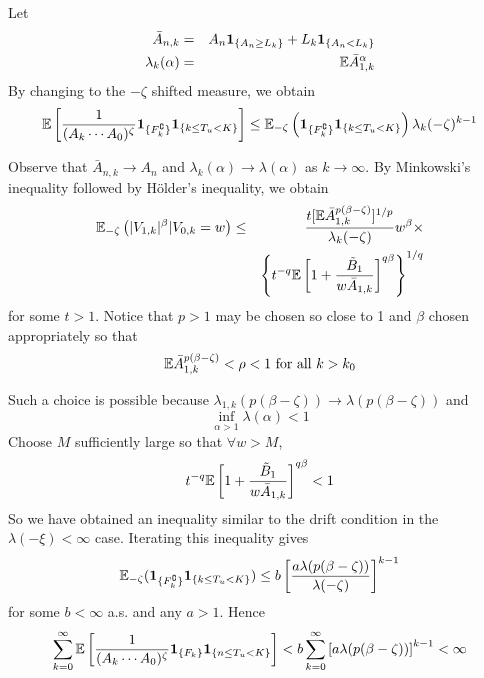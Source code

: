 \documentclass{beamer}
\begin{document}
\begin{frame}
  Let
  \begin{eqnarray*}
    \bar A_{n,k} &=& A_{n} \mathbf{1}_{\{A_n \geq L_k\}} + L_k \mathbf{1}_{\{A_n < L_k\}} \\
    \lambda_k(\alpha) &=& \mathbb{E} \bar A_{1,k}^\alpha
  \end{eqnarray*}
  By changing to the $-\zeta$ shifted measure, we obtain
  \[
  \mathbb{E} \left[
  {
    1\over
    (A_k \cdots A_0)^\zeta
  } \mathbf{1}_{\{F_k^\complement\}} \mathbf{1}_{\{k \leq T_u < K\}} \right]
  \leq \mathbb{E}_{-\zeta}\left(\mathbf{1}_{\{F_k^\complement\}} \mathbf{1}_{\{k \leq T_u < K\}}\right)
  \lambda_k(-\zeta)^{k-1} 
  \]
\end{frame}

\begin{frame}
  Observe that $\bar A_{n,k} \to A_n$ and $\lambda_k(\alpha) \to
  \lambda(\alpha)$ as $k \to \infty$. By Minkowski's inequality
  followed by H\"older's inequality, we obtain
  \begin{eqnarray*}
    \mathbb{E}_{-\zeta} \left( |V_{1,k}|^\beta | V_{0,k} = w\right) &\leq& {
    t [\mathbb{E} \bar A_{1,k}^{p(\beta - \zeta)}]^{1/p}
    \over
    \lambda_k(-\zeta)
  } w^\beta \times \\
  && \left\{
    t^{-q} \mathbb{E} \left[
      1 + {
        \tilde B_1
        \over
        w \bar A_{1,k}
      }
    \right]^{q\beta}
  \right\}^{1/q}
  \end{eqnarray*}
  for some $t > 1$. Notice that $p > 1$ may be chosen so close to 1
  and $\beta$ chosen appropriately so that
  \[
  \mathbb{E} \bar A_{1,k}^{p(\beta - \zeta)} < \rho < 1 \text{ for all } k > k_0
  \]
\end{frame}

\begin{frame}
  Such a choice is possible because $\lambda_{1,k}(p(\beta - \zeta))
  \to \lambda(p(\beta - \zeta))$ and
  \[
  \inf_{\alpha > 1} \lambda(\alpha) < 1
  \]
  Choose $M$ sufficiently large so that $\forall w > M$,
  \[
    t^{-q} \mathbb{E} \left[
      1 + {
        \tilde B_1
        \over
        w \bar A_{1,k}
      }
    \right]^{q\beta} < 1
  \]
  So we have obtained an inequality similar to the drift condition in
  the $\lambda(-\xi) < \infty$ case.  Iterating this inequality gives
  \[
  \mathbb{E}_{-\zeta}(\mathbf{1}_{\{F_k^\complement\}} \mathbf{1}_{\{k \leq T_u < K\}}) \leq b \left[
  {
    a \lambda (p(\beta - \zeta))
    \over
    \lambda(-\zeta)
  }
\right]^{k-1}
  \]
  for some $b < \infty$ a.s. and any $a > 1$. Hence
  \[
  \sum_{k=0}^\infty \mathbb{E} \left[
    {
      1 \over
      (A_k \cdots A_0)^\zeta
    }  \mathbf{1}_{\{F_k\}}  \mathbf{1}_{\{n \leq T_u < K\}}
  \right]
  <
  b \sum_{k=0}^\infty \left[
    {
      a \lambda (p(\beta - \zeta))
    }
  \right]^{k-1} < \infty
  \]
\end{frame}
\end{document}

